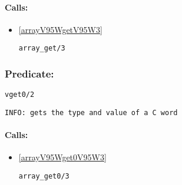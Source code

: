 \paragraph{Calls:} 
\begin{itemize}
\item \ref{arrayV95WgetV95W3} 
\begin{verbatim}
array_get/3
\end{verbatim}

\end{itemize}

\subsubsection{Predicate:} \label{vget0V95W2}

\begin{verbatim}
vget0/2
\end{verbatim}

{\small \begin{verbatim}
INFO: gets the type and value of a C word

\end{verbatim}}
\paragraph{Calls:} 
\begin{itemize}
\item \ref{arrayV95Wget0V95W3} 
\begin{verbatim}
array_get0/3
\end{verbatim}

\end{itemize}
